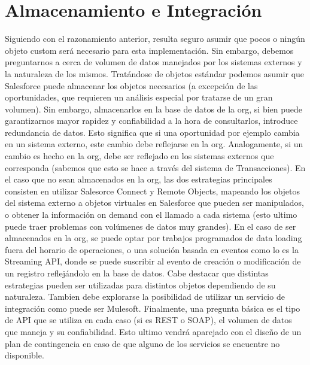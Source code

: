 \documentclass{article}
\begin{document}
\section{Almacenamiento e Integración}

Siguiendo con el razonamiento anterior, resulta seguro asumir que pocos o ningún objeto custom será necesario para esta implementación.
\newline
Sin embargo, debemos preguntarnos a cerca de volumen de datos manejados por los sistemas externos y la naturaleza de los mismos.
Tratándose de objetos estándar podemos asumir que Salesforce puede almacenar los objetos necesarios (a excepción de las oportunidades, que requieren un análisis especial por tratarse de un gran volumen). 
\newline \newline
Sin embargo, almacenarlos en la base de datos de la org, si bien puede garantizarnos mayor rapidez y confiabilidad a la hora de consultarlos, introduce redundancia de datos. Esto significa que si una oportunidad por ejemplo cambia en un sistema externo, este cambio debe reflejarse en la org. Analogamente, si un cambio es hecho en la org, debe ser reflejado en los sistemas externos que corresponda (sabemos que esto se hace a través del sistema de Transacciones). 
\newline \newline
En el caso que no sean almacenados en la org, las dos estrategias principales consisten en utilizar Salesorce Connect y Remote Objects, mapeando los objetos del sistema externo a objetos virtuales en Salesforce que pueden ser manipulados, o obtener la información on demand con el llamado a cada sistema (esto ultimo puede traer problemas con volúmenes de datos muy grandes).
\newline \newline
En el caso de ser almacenados en la org, se puede optar por trabajos programados de data loading fuera del horario de operaciones, o una solución basada en eventos como lo es la Streaming API, donde se puede suscribir al evento de creación o modificación de un registro reflejándolo en la base de datos.
Cabe destacar que distintas estrategias pueden ser utilizadas para distintos objetos dependiendo de su naturaleza.
\newline \newline
Tambien debe explorarse la posibilidad de utilizar un servicio de integración como puede ser Mulesoft.
\newline \newline
Finalmente, una pregunta básica es el tipo de API que se utiliza en cada caso (si es REST o SOAP), el volumen de datos que maneja y su confiabilidad. Esto ultimo vendrá aparejado con el diseño de un plan de contingencia en caso de que alguno de los servicios se encuentre no disponible.
\end{document}
